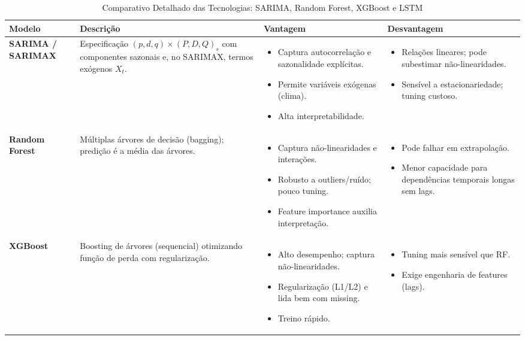 \begin{table}[!ht]
    \centering
    \small
    \caption{Comparativo Detalhado das Tecnologias: SARIMA, Random Forest, XGBoost e LSTM}
    \label{tab:comparativo_detalhado_tecnologias}
    \setlength{\tabcolsep}{3pt} %
    \begin{tabular}{|p{}|p{}|p{}|p{}|}
    \hline
    \textbf{Modelo} & \textbf{Descrição} & \textbf{Vantagem} & \textbf{Desvantagem} \\ \hline
    \textbf{SARIMA / SARIMAX} & Especificação $(p,d,q)\times(P,D,Q)_s$ com componentes sazonais e, no SARIMAX, termos exógenos $X_t$. & \begin{itemize}[leftmargin=*,noitemsep,topsep=0pt] \item Captura autocorrelação e sazonalidade explícitas. \item Permite variáveis exógenas (clima). \item Alta interpretabilidade. \end{itemize} & \begin{itemize}[leftmargin=*,noitemsep,topsep=0pt] \item Relações lineares; pode subestimar não-linearidades. \item Sensível a estacionariedade; tuning custoso. \end{itemize} \\ \hline
    \textbf{Random Forest} & Múltiplas árvores de decisão (bagging); predição é a média das árvores. & \begin{itemize}[leftmargin=*,noitemsep,topsep=0pt] \item Captura não-linearidades e interações. \item Robusto a outliers/ruído; pouco tuning. \item Feature importance auxilia interpretação. \end{itemize} & \begin{itemize}[leftmargin=*,noitemsep,topsep=0pt] \item Pode falhar em extrapolação. \item Menor capacidade para dependências temporais longas sem lags. \end{itemize} \\ \hline
    \textbf{XGBoost} & Boosting de árvores (sequencial) otimizando função de perda com regularização. & \begin{itemize}[leftmargin=*,noitemsep,topsep=0pt] \item Alto desempenho; captura não-linearidades. \item Regularização (L1/L2) e lida bem com missing. \item Treino rápido. \end{itemize} & \begin{itemize}[leftmargin=*,noitemsep,topsep=0pt] \item Tuning mais sensível que RF. \item Exige engenharia de features (lags). \end{itemize} \\ \hline

\end{tabular}
\end{table}
